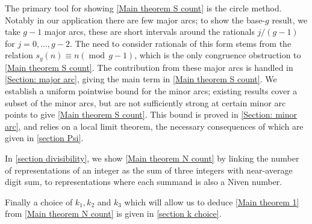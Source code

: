 \documentclass[hidelinks,11pt,reqno]{amsart}
\newcommand{\sd}[1]{s_{g}(#1)}
\theoremstyle{remark}
\newcommand{\md}[1]{\ensuremath{(\operatorname{mod}\, #1)}}
\begin{document}
The primary tool for showing \cref{Main theorem S count} is the circle method. Notably in our application there are few major arcs; to show the base-$g$ result, we take $g-1$ major arcs, these are short intervals around the rationals $j/(g-1)$ for $j=0,\ldots, g-2$. The need to consider rationals of this form stems from the relation $\sd{n}\equiv n\md{g-1}$, which is the only congruence obstruction to \cref{Main theorem S count}. The contribution from these major arcs is handled in \cref{Section: major arc}, giving the main term in \cref{Main theorem S count}. We establish a uniform pointwise bound for the minor arcs; existing results cover a subset of the minor arcs, but are not sufficiently strong at certain minor arc points to give \cref{Main theorem S count}. This bound is proved in \cref{Section: minor arc}, and relies on a local limit theorem, the necessary consequences of which are given in \cref{section Psi}. 

In \cref{section divisibility}, we show \cref{Main theorem N count} by linking the number of representations of an integer as the sum of three integers with near-average digit sum, to representations where each summand is also a Niven number. 

Finally a choice of $k_{1},k_{2}$ and $k_{3}$ which will allow us to deduce \cref{Main theorem 1} from \cref{Main theorem N count} is given in \cref{section k choice}. 
\end{document}
